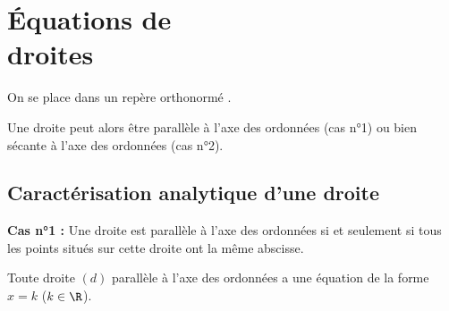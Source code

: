 \documentclass[10pt,openright,twoside,french]{book}
\begin{document}
\renewcommand\PartProgramme{Géométrie}
\chapter[\'Equations de droites]{\'Equations de \\ droites}\label{ch_equations_droites}

On se place dans un repère orthonormé \OIJ.\par Une droite peut alors être parallèle à l'axe des ordonnées (cas n°1) ou bien sécante à l'axe des ordonnées (cas n°2).

\section{Caractérisation analytique d'une droite}

\begin{minipage}{0.6\textwidth}
\textbf{Cas n°1 :} Une droite est parallèle à l'axe des ordonnées si et seulement si tous les points situés sur cette droite ont la même abscisse.

\begin{Prop}
    Toute droite $(d)$ parallèle à l'axe des ordonnées a une équation  de la forme $x = k$ ($k \in \R$).
\end{Prop}
\end{minipage}%
\begin{minipage}{0.4\textwidth}
    \begin{center}
    \end{center}
\end{minipage}
\end{document}
